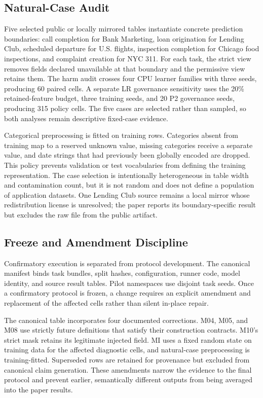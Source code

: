 \documentclass[sigconf,review]{acmart}
\begin{document}
\subsection{Natural-Case Audit}

Five selected public or locally mirrored tables instantiate concrete prediction
boundaries: call completion for Bank Marketing, loan origination for Lending
Club, scheduled departure for U.S. flights, inspection completion for Chicago
food inspections, and complaint creation for NYC 311. For each task, the
strict view removes fields declared unavailable at that boundary and the
permissive view retains them. The harm audit crosses four CPU learner families
with three seeds, producing 60 paired cells. A separate LR governance
sensitivity uses the 20\% retained-feature budget, three training seeds, and 20
P2 governance seeds, producing 315 policy cells. The five cases are selected
rather than sampled, so both analyses remain descriptive fixed-case evidence.

Categorical preprocessing is fitted on training rows. Categories absent from
training map to a reserved unknown value, missing categories receive a separate
value, and date strings that had previously been globally encoded are dropped.
This policy prevents validation or test vocabularies from defining the
training representation. The case selection is intentionally heterogeneous in
table width and contamination count, but it is not random and does not define
a population of application datasets. One Lending Club source remains a local
mirror whose redistribution license is unresolved; the paper reports its
boundary-specific result but excludes the raw file from the public artifact.

\subsection{Freeze and Amendment Discipline}

Confirmatory execution is separated from protocol development. The canonical
manifest binds task bundles, split hashes, configuration, runner code, model
identity, and source result tables. Pilot namespaces use disjoint task seeds.
Once a confirmatory protocol is frozen, a change requires an explicit amendment
and replacement of the affected cells rather than silent in-place repair.

The canonical table incorporates four documented corrections. M04, M05, and
M08 use strictly future definitions that satisfy their construction contracts.
M10's strict mask retains its legitimate injected field. MI uses a fixed random
state on training data for the affected diagnostic cells, and natural-case
preprocessing is training-fitted. Superseded rows are
retained for provenance but excluded from canonical claim generation. These
amendments narrow the evidence to the final protocol and prevent earlier,
semantically different outputs from being averaged into the paper results.
\end{document}
